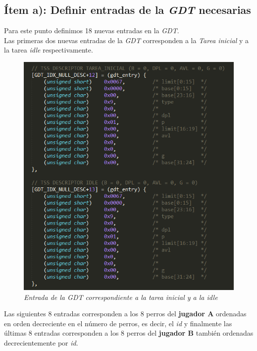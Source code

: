 \subsection{Ítem a): Definir entradas de la \textit{GDT} necesarias}
Para este punto definimos 18 nuevas entradas en la \textit{GDT}.\\

Las primeras dos nuevas entradas de la \textit{GDT} corresponden a la \textit{Tarea inicial} y a la tarea \textit{idle} respectivamente. 


\begin{figure}[H]
\begin{center}
\includegraphics[width=\linewidth]{ejercicio6/gdt_inicial_idle.png}
\caption{{\small \textit{Entrada de la \textit{GDT} correspondiente a la tarea inicial y a la idle }}}
\endminipage
\end{center}
\end{figure}

Las siguientes 8 entradas corresponden a los 8 perros del \textbf{jugador A} ordenadas en orden decreciente en el número de perros, es decir, el \textit{id} y finalmente las últimas 8 entradas corresponden a los 8 perros del \textbf{jugador B } también ordenadas decrecientemente por \textit{id}.\\

